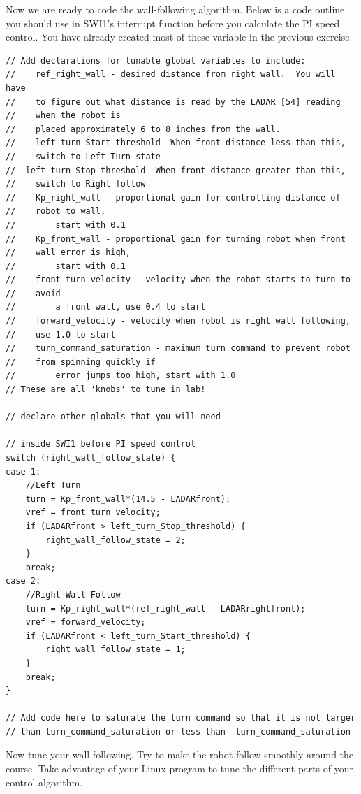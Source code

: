 \documentclass[11pt]{article}
\begin{document}
    Now we are ready to code the wall-following algorithm. Below is a code outline you should use in SWI1’s interrupt function before you calculate the PI speed control. You have already created most of these variable in the previous exercise.
\begin{verbatim}
// Add declarations for tunable global variables to include:
//    ref_right_wall - desired distance from right wall.  You will have
//    to figure out what distance is read by the LADAR [54] reading
//    when the robot is
//    placed approximately 6 to 8 inches from the wall.
//    left_turn_Start_threshold  When front distance less than this,
//    switch to Left Turn state
//  left_turn_Stop_threshold  When front distance greater than this,
//    switch to Right follow
//    Kp_right_wall - proportional gain for controlling distance of
//    robot to wall,
//        start with 0.1
//    Kp_front_wall - proportional gain for turning robot when front
//    wall error is high,
//        start with 0.1
//    front_turn_velocity - velocity when the robot starts to turn to
//    avoid
//        a front wall, use 0.4 to start
//    forward_velocity - velocity when robot is right wall following,
//    use 1.0 to start
//    turn_command_saturation - maximum turn command to prevent robot
//    from spinning quickly if
//        error jumps too high, start with 1.0
// These are all 'knobs' to tune in lab!

// declare other globals that you will need

// inside SWI1 before PI speed control
switch (right_wall_follow_state) {
case 1:
    //Left Turn
    turn = Kp_front_wall*(14.5 - LADARfront);
    vref = front_turn_velocity;
    if (LADARfront > left_turn_Stop_threshold) {
        right_wall_follow_state = 2;
    }
    break;
case 2:
    //Right Wall Follow
    turn = Kp_right_wall*(ref_right_wall - LADARrightfront);
    vref = forward_velocity;
    if (LADARfront < left_turn_Start_threshold) {
        right_wall_follow_state = 1;
    }
    break;
}

// Add code here to saturate the turn command so that it is not larger
// than turn_command_saturation or less than -turn_command_saturation
\end{verbatim}
    Now tune your wall following. Try to make the robot follow smoothly around the course. Take advantage of your Linux program to tune the different parts of your control algorithm.
\end{document}
